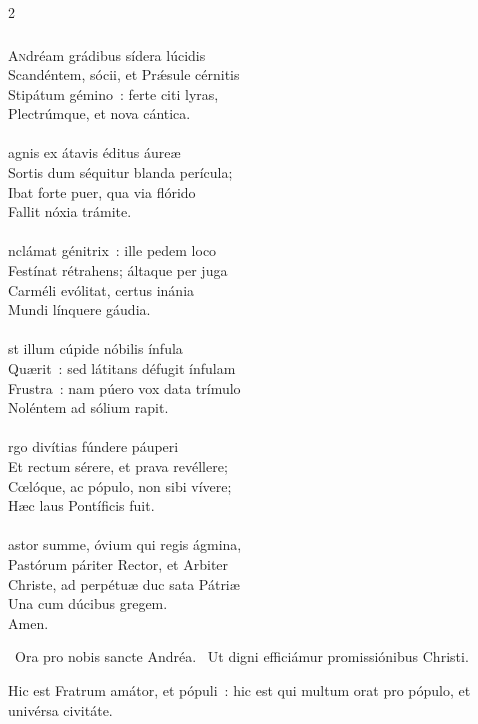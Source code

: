 \documentclass[9pt,twoside]{extarticle}
\begin{document}
\begin{multicols}{2}
{{{\subsubsection*{\center {}}
\lettrine{A}ndréam grádibus sídera lúcidis\\
Scandéntem, sócii, et Prǽsule cérnitis\\
Stipátum gémino~: ferte citi lyras,\\
Plectrúmque, et nova cántica.\\
\\
agnis ex átavis éditus áureæ\\
Sortis dum séquitur blanda perícula;\\
Ibat forte puer, qua via flórido\\
Fallit nóxia trámite.\\
\\
nclámat génitrix~: ille pedem loco\\
Festínat rétrahens; áltaque per juga\\
Carméli evólitat, certus inánia\\
Mundi línquere gáudia.\\
\\
st illum cúpide nóbilis ínfula\\
Quærit~: sed látitans défugit ínfulam\\
Frustra~: nam púero vox data trímulo\\
Noléntem ad sólium rapit.\\
\\
rgo divítias fúndere páuperi\\
Et rectum sérere, et prava revéllere;\\
Cœlóque, ac pópulo, non sibi vívere;\\
Hæc laus Pontíficis fuit.\\
\\
astor summe, óvium qui regis ágmina,\\
Pastórum páriter Rector, et Arbiter\\
Christe, ad perpétuæ duc sata Pátriæ\\
Una cum dúcibus gregem.\\
Amen.

\begin{tightlist}{}
\item {}~Ora pro nobis sancte Andréa. ~Ut digni efficiámur promissiónibus Christi.
\item {} Hic est Fratrum amátor, et pópuli~: hic est qui multum orat pro pópulo, et univérsa civitáte.
\end{tightlist}

}}}
\end{multicols}
\end{document}
